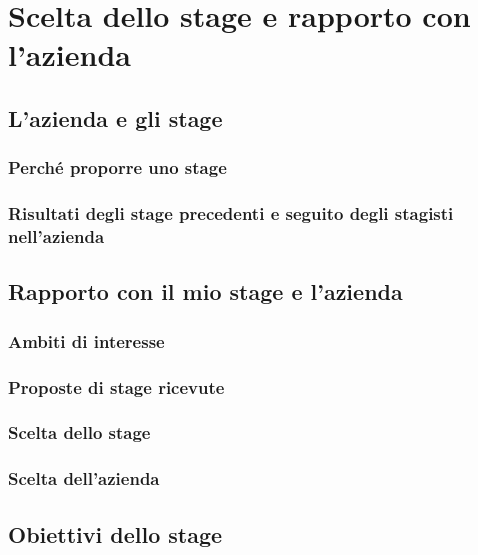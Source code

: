 \chapter{Scelta dello stage e rapporto con l'azienda}

\section{L'azienda e gli stage}

   \subsection{Perché proporre uno stage}

   \subsection{Risultati degli stage precedenti e seguito degli stagisti nell'azienda}

\section{Rapporto con il mio stage e l'azienda}

   \subsection{Ambiti di interesse}

   \subsection{Proposte di stage ricevute}

   \subsection{Scelta dello stage}

   \subsection{Scelta dell'azienda}

\section{Obiettivi dello stage}

